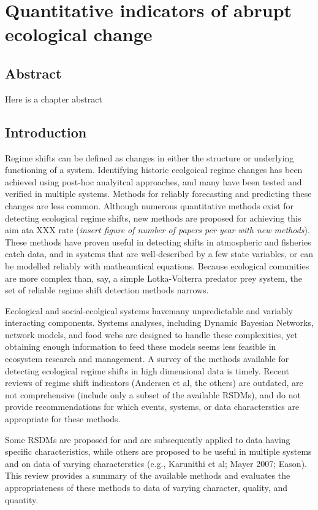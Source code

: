 \documentclass[12pt,twoside]{reedthesis}
\begin{document}
\chapter{Quantitative indicators of abrupt ecological
change}\label{indicators-chapter}

\section{Abstract}\label{abstract}

Here is a chapter abstract

\section{Introduction}\label{introduction}

Regime shifts can be defined as changes in either the structure or
underlying functioning of a system. Identifying historic ecolgoical
regime changes has been achieved using post-hoc analyitcal approaches,
and many have been tested and verified in multiple systems. Methods for
reliably forecasting and predicting these changes are less common.
Although numerous quantitative methods exist for detecting ecological
regime shifts, new methods are proposed for achieving this aim ata XXX
rate (\emph{insert figure of number of papers per year with new
methods}). These methods have proven useful in detecting shifts in
atmospheric and fisheries catch data, and in systems that are
well-described by a few state variables, or can be modelled reliably
with matheamtical equations. Because ecological comunities are more
complex than, say, a simple Lotka-Volterra predator prey system, the set
of reliable regime shift detection methods narrows.

Ecological and social-ecolgical systems havemany unpredictable and
variably interacting components. Systems analyses, including Dynamic
Bayesian Networks, network models, and food webs are designed to handle
these complexities, yet obtaining enough information to feed these
models seems less feasible in ecosystem research and management. A
survey of the methods available for detecting ecological regime shifts
in high dimensional data is timely. Recent reviews of regime shift
indicators (Andersen et al, the others) are outdated, are not
comprehensive (include only a subset of the available RSDMs), and do not
provide recommendations for which events, systems, or data
characterstics are appropriate for these methods.

Some RSDMs are proposed for and are subsequently applied to data having
specific characteristics, while others are proposed to be useful in
multiple systems and on data of varying characterstics (e.g., Karunithi
et al; Mayer 2007; Eason). This review provides a summary of the
available methods and evaluates the appropriateness of these methods to
data of varying character, quality, and quantity.
\end{document}

